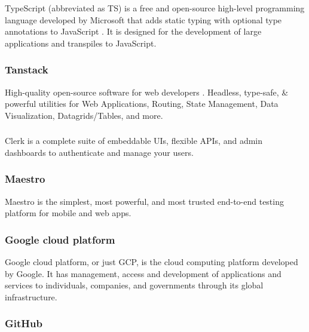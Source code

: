 TypeScript (abbreviated as TS) is a free and open-source high-level programming language developed by Microsoft that adds static typing with optional type annotations to JavaScript \cite{TypeScriptDocs2023}. It is designed for the development of large applications and transpiles to JavaScript.

\subsubsection*{\protect{} Tanstack}
                                                                      
High-quality open-source software for web developers \cite{TanstackWebsite}. Headless, type-safe, \& powerful utilities for Web Applications, Routing, State Management, Data Visualization, Datagrids/Tables, and more.

\subsubsection*{\protect{}}
                                                                        
Clerk \cite{ClerkAuthenticationDocs} is a complete suite of embeddable UIs, flexible APIs, and admin dashboards to authenticate and manage your users.

\subsubsection*{\protect{} Maestro}
                                                                        
Maestro \cite{MaestroDocs2022} is the simplest, most powerful, and most trusted end-to-end testing platform for mobile and web apps.

\subsubsection*{\protect{} Google cloud platform}

Google cloud platform, or just GCP, is the cloud computing platform developed by Google. It has management, access and development of applications and services to individuals, companies, and governments through its global infrastructure.

\subsubsection*{\protect{} GitHub}

